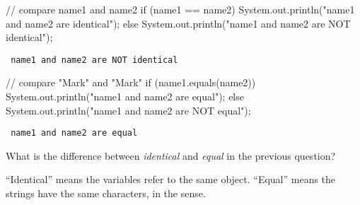 \begin{javalst}
// compare name1 and name2
if (name1 == name2) {
    System.out.println("name1 and name2 are identical");
} else {
    System.out.println("name1 and name2 are NOT identical");
}
\end{javalst}

\vspace{-2ex}
\begin{answer}[1em]
\tt \hspace{1em} name1 and name2 are NOT identical
\end{answer}

\begin{javalst}
// compare "Mark" and "Mark"
if (name1.equals(name2)) {
    System.out.println("name1 and name2 are equal");
} else {
    System.out.println("name1 and name2 are NOT equal");
}
\end{javalst}

\vspace{-2ex}
\begin{answer}[1em]
\tt \hspace{1em} name1 and name2 are equal
\end{answer}


\Q \label{key3}
What is the difference between \emph{identical} and \emph{equal} in the previous question?

\begin{answer}[4em]
``Identical'' means the variables refer to the same  object.
``Equal'' means the strings have the same characters, in the  sense.
\end{answer}
